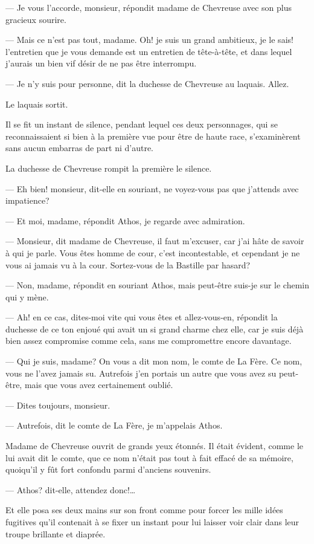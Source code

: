 — Je vous l'accorde, monsieur, répondit madame de Chevreuse avec son plus gracieux sourire.

— Mais ce n'est pas tout, madame. Oh! je suis un grand ambitieux, je le sais! l'entretien que je vous demande est un entretien de tête-à-tête, et dans lequel j'aurais un bien vif désir de ne pas être interrompu.

— Je n'y suis pour personne, dit la duchesse de Chevreuse au laquais. Allez.

Le laquais sortit.

Il se fit un instant de silence, pendant lequel ces deux personnages, qui se reconnaissaient si bien à la première vue pour être de haute race, s'examinèrent sans aucun embarras de part ni d'autre.

La duchesse de Chevreuse rompit la première le silence.

— Eh bien! monsieur, dit-elle en souriant, ne voyez-vous pas que j'attends avec impatience?

— Et moi, madame, répondit Athos, je regarde avec admiration.

— Monsieur, dit madame de Chevreuse, il faut m'excuser, car j'ai hâte de savoir à qui je parle. Vous êtes homme de cour, c'est incontestable, et cependant je ne vous ai jamais vu à la cour. Sortez-vous de la Bastille par hasard?

— Non, madame, répondit en souriant Athos, mais peut-être suis-je sur le chemin qui y mène.

— Ah! en ce cas, dites-moi vite qui vous êtes et allez-vous-en, répondit la duchesse de ce ton enjoué qui avait un si grand charme chez elle, car je suis déjà bien assez compromise comme cela, sans me compromettre encore davantage.

— Qui je suis, madame? On vous a dit mon nom, le comte de La Fère. Ce nom, vous ne l'avez jamais su. Autrefois j'en portais un autre que vous avez su peut-être, mais que vous avez certainement oublié.

— Dites toujours, monsieur.

— Autrefois, dit le comte de La Fère, je m'appelais Athos.

Madame de Chevreuse ouvrit de grands yeux étonnés. Il était évident, comme le lui avait dit le comte, que ce nom n'était pas tout à fait effacé de sa mémoire, quoiqu'il y fût fort confondu parmi d'anciens souvenirs.

— Athos? dit-elle, attendez donc!\dots

Et elle posa ses deux mains sur son front comme pour forcer les mille idées fugitives qu'il contenait à se fixer un instant pour lui laisser voir clair dans leur troupe brillante et diaprée.

